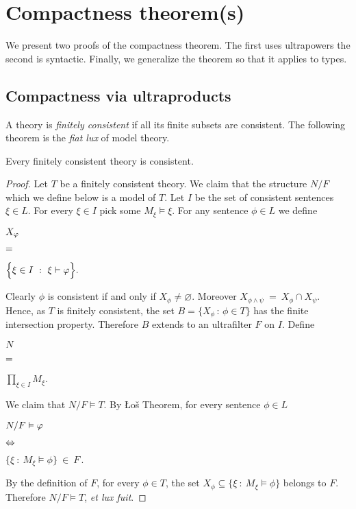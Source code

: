 \chapter{Compactness theorem(s)}
\label{compactness}

\def\medrel#1{\parbox[t]{6ex}{$\displaystyle\hfil #1$}}
\def\ceq#1#2#3{\parbox{20ex}{$\displaystyle #1$}\medrel{#2}$\displaystyle  #3$}

We present two proofs of the compactness theorem.
The first uses ultrapowers the second is syntactic.
Finally, we generalize the theorem so that it applies to types.

\section{Compactness via ultraproducts}\label{compactness_Ultra}
\def\medrel#1{\parbox[t]{6ex}{$\displaystyle\hfil #1$}}
\def\ceq#1#2#3{\parbox{25ex}{$\displaystyle #1$}\medrel{#2}$\displaystyle  #3$}

A theory is \emph{finitely consistent\/} if all its finite subsets are consistent.
The following theorem is the \textit{fiat lux\/} of model theory. 

\begin{void}\label{thmcompattezza}
Every finitely consistent theory is consistent. 
\end{void}

\begin{proof}
Let  $T$ be a finitely consistent theory. 
We claim that the structure $N/F$ which we define below is a model of $T$. Let $I$ be the set of consistent sentences $\xi\in L$.
For every $\xi\in I$ pick some $M_\xi\models\xi$.
For any sentence $\phi\in L$ we define

\ceq{\hfill X_\phi}{=}{\Big\{\xi\in I\ :\ \xi\proves \phi\Big\}.}

Clearly $\phi$ is consistent if and only if $X_\phi\neq\varnothing$.
Moreover $X_{\phi\wedge\psi}\ =\ X_\phi\cap X_\psi$.
Hence, as $T$ is finitely consistent, the set $B=\big\{X_\phi\,:\,\phi\in T\big\}$ has the finite intersection property. Therefore $B$ extends to an ultrafilter $F$ on $I$. Define

\ceq{\hfill N}{=}{\prod_{\xi\in I}M_\xi}.

We claim that $N/F\models T$. By \L o\v{s} Theorem, for every sentence $\phi\in L$

\ceq{\hfill N/F\models \phi}%
{\IFF}%
{\Big\{\xi\ :\ M_\xi\models\phi\Big\}\ \in\ F\,.}

By the definition of $F$, for every $\phi\in T$, the set $X_\phi\subseteq \big\{\xi\ :\ M_\xi\models \phi\big\}$ belongs to $F$. Therefore $N/F\models T$, \textit{et lux fuit}.
\end{proof}

